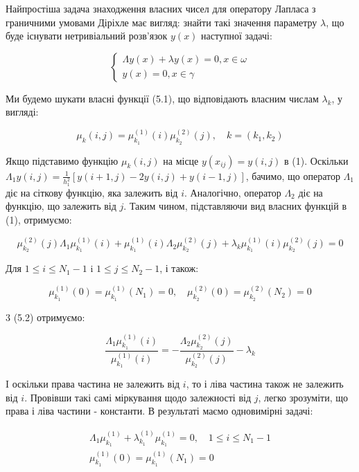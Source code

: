 Найпростіша задача знаходження власних чисел для оператору Лапласа з граничними умовами Діріхле має вигляд: знайти такі значення параметру $\lambda$, що буде існувати нетривіальний розв'язок $y(x)$ наступної задачі:

\begin{equation}
    \begin{cases}
        \Lambda y(x)+\lambda y(x)=0, x \in \omega \\
        y(x)=0, x \in \gamma
    \end{cases}
\end{equation}
    
Ми будемо шукати власні функції (5.1), що відповідають власним числам $\lambda_{k}$, у вигляді:




$$
\mu_{k}(i, j)=\mu_{k_{1}}^{(1)}(i) \mu_{k_{2}}^{(2)}(j), \quad k=\left(k_{1}, k_{2}\right)
$$

Якщо підставимо функцію $\mu_{k}(i, j)$ на місце $y\left(x_{i j}\right)=y(i, j)$ в (1). Оскільки $\Lambda_{1} y(i, j)=\frac{1}{h_{1}^{2}}[y(i+1, j)-2 y(i, j)+y(i-1, j)]$, бачимо, що оператор $\Lambda_{1}$ діє на сіткову функцію, яка залежить від $i$. Аналогічно, оператор $\Lambda_{2}$ діє на функцію, що залежить від $j$. Таким чином, підставляючи вид власних функцій в (1), отримуємо:

\begin{equation*}
\mu_{k_{2}}^{(2)}(j) \Lambda_{1} \mu_{k_{1}}^{(1)}(i)+\mu_{k_{1}}^{(1)}(i) \Lambda_{2} \mu_{k_{2}}^{(2)}(j)+\lambda_{k} \mu_{k_{1}}^{(1)}(i) \mu_{k_{2}}^{(2)}(j)=0 \tag{5.2}
\end{equation*}

Для $1 \leq i \leq N_{1}-1$ i $1 \leq j \leq N_{2}-1$, і також:

$$
\mu_{k_{1}}^{(1)}(0)=\mu_{k_{1}}^{(1)}\left(N_{1}\right)=0, \quad \mu_{k_{2}}^{(2)}(0)=\mu_{k_{2}}^{(2)}\left(N_{2}\right)=0
$$

3 (5.2) отримуємо:

$$
\frac{\Lambda_{1} \mu_{k_{1}}^{(1)}(i)}{\mu_{k_{1}}^{(1)}(i)}=-\frac{\Lambda_{2} \mu_{k_{2}}^{(2)}(j)}{\mu_{k_{2}}^{(2)}(j)}-\lambda_{k}
$$

I оскільки права частина не залежить від $i$, то і ліва частина також не залежить від $i$. Провівши такі самі міркування щодо залежності від $j$, легко зрозуміти, що права і ліва частини - константи. В результаті маємо одновимірні задачі:

$$
\begin{gathered}
\Lambda_{1} \mu_{k_{1}}^{(1)}+\lambda_{k_{1}}^{(1)} \mu_{k_{1}}^{(1)}=0, \quad 1 \leq i \leq N_{1}-1 \\
\mu_{k_{1}}^{(1)}(0)=\mu_{k_{1}}^{(1)}\left(N_{1}\right)=0
\end{gathered}
$$

